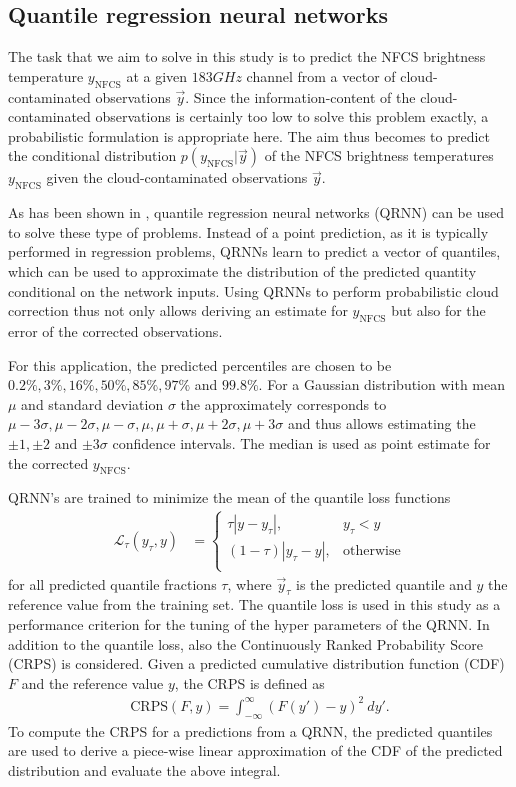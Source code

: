 \documentclass[amt]{copernicus}
\newcommand{\ynfcs}{y_\text{NFCS}}
\newcommand{\y}{\vec{y}}
\begin{document}
\subsection{Quantile regression neural networks}
\label{sec:QRNN}
%
The task that we aim to solve in this study is to predict the NFCS brightness
temperature $\ynfcs$ at a given $183\unit{GHz}$ channel from a vector of
cloud-contaminated observations $\y$. Since the information-content of the
cloud-contaminated observations is certainly too low to solve this problem
exactly, a probabilistic formulation is appropriate here. The aim thus becomes
to predict the conditional distribution $p(\ynfcs | \y)$ of the NFCS brightness
temperatures $\ynfcs$ given the cloud-contaminated observations $\y$.

As has been shown in \citet{pfreundschuh:aneur:18}, quantile regression neural
networks (QRNN) can be used to solve these type of problems. Instead of a point
prediction, as it is typically performed in regression problems, QRNNs learn to
predict a vector of quantiles, which can be used to approximate the distribution
of the predicted quantity conditional on the network inputs. Using QRNNs to
perform probabilistic cloud correction thus not only allows deriving an estimate
for $\ynfcs$ but also for the error of the corrected observations.

For this application, the predicted percentiles are chosen to be
$0.2\%, 3\%, 16\%, 50\%, 85\%, 97\%$ and $99.8\%$. For a Gaussian
distribution with mean $\mu$ and standard deviation $\sigma$ the
approximately corresponds to $\mu -3\sigma, \mu-2\sigma, \mu-\sigma
, \mu, \mu + \sigma, \mu + 2\sigma, \mu + 3\sigma$ and thus allows
estimating the $\pm 1, \pm 2$ and $\pm 3\sigma$ confidence intervals.
The median is used as point estimate for the corrected $\ynfcs$.

QRNN's are trained to minimize the mean of the quantile loss functions
%
\begin{align}
  \mathcal{L}_\tau(y_\tau, y) &=
  \begin{cases}
    \tau|y - y_\tau|, & y_\tau < y \\ (1 - \tau)|y_\tau - y|, & \text{otherwise}
    \\
  \end{cases}
\end{align}
%
for all predicted quantile fractions $\tau$, where $\y_\tau$ is the predicted
quantile and $y$ the reference value from the training set. The quantile loss is
used in this study as a performance criterion for the tuning of the hyper
parameters of the QRNN. In addition to the quantile loss, also the Continuously
Ranked Probability Score (CRPS) is considered. Given a predicted cumulative
distribution function (CDF) $F$ and the reference value $y$, the CRPS is defined as
%
\begin{align}
  \text{CRPS}(F, y) = \int_{-\infty}^{\infty} \left (F(y') - y\right )^2\: dy'.
\end{align}
%
To compute the CRPS for a predictions from a QRNN, the predicted quantiles are
used to derive a piece-wise linear approximation of the CDF of the predicted
distribution and evaluate the above integral.
\end{document}
